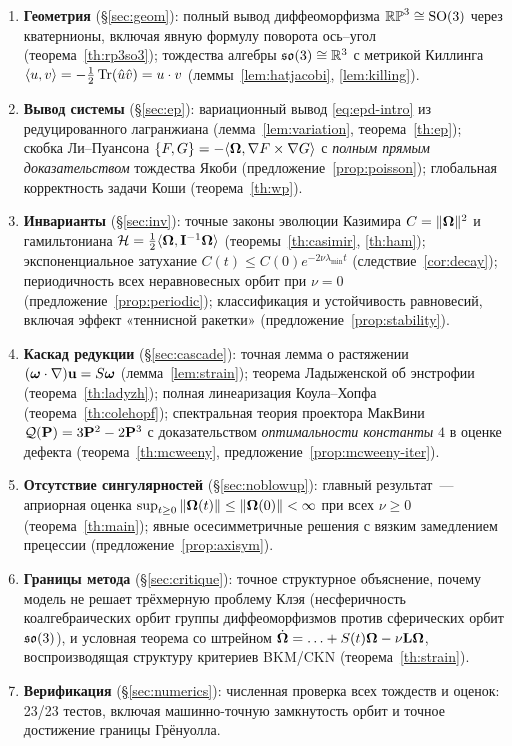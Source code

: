 \begin{enumerate}[label=\textup{(\roman*)}, leftmargin=2.2em, itemsep=2pt]
  \item \textbf{Геометрия} (\S\ref{sec:geom}): полный вывод диффеоморфизма
        $\mathbb{RP}^3 \cong \mathrm{SO}(3)$ через кватернионы, включая явную
        формулу поворота ось--угол (теорема~\ref{th:rp3so3}); тождества
        алгебры $\mathfrak{so}(3) \cong \mathbb{R}^3$ с метрикой Киллинга
        $\langle u,v\rangle = -\tfrac12\operatorname{Tr}(\hat u \hat v) = u\cdot v$
        (леммы~\ref{lem:hatjacobi}, \ref{lem:killing}).
  \item \textbf{Вывод системы} (\S\ref{sec:ep}): вариационный вывод
        \eqref{eq:epd-intro} из редуцированного лагранжиана
        (лемма~\ref{lem:variation}, теорема~\ref{th:ep}); скобка
        Ли--Пуансона $\{F,G\} = -\langle\boldsymbol{\Omega}, \nabla F \times \nabla G\rangle$
        с \emph{полным прямым доказательством} тождества Якоби
        (предложение~\ref{prop:poisson}); глобальная корректность задачи
        Коши (теорема~\ref{th:wp}).
  \item \textbf{Инварианты} (\S\ref{sec:inv}): точные законы эволюции
        Казимира $C = \|\boldsymbol{\Omega}\|^2$ и гамильтониана
        $\mathcal H = \tfrac12\langle\boldsymbol{\Omega},\mathbf{I}^{-1}\boldsymbol{\Omega}\rangle$
        (теоремы~\ref{th:casimir}, \ref{th:ham}); экспоненциальное
        затухание $C(t) \le C(0)e^{-2\nu\lambda_{\min}t}$
        (следствие~\ref{cor:decay}); периодичность всех неравновесных
        орбит при $\nu = 0$ (предложение~\ref{prop:periodic});
        классификация и устойчивость равновесий, включая эффект
        «теннисной ракетки» (предложение~\ref{prop:stability}).
  \item \textbf{Каскад редукции} (\S\ref{sec:cascade}):
        точная лемма о растяжении $(\boldsymbol{\omega}\cdot\nabla)\mathbf{u} = S\boldsymbol{\omega}$
        (лемма~\ref{lem:strain}); теорема Ладыженской об энстрофии
        (теорема~\ref{th:ladyzh}); полная линеаризация Коула--Хопфа
        (теорема~\ref{th:colehopf}); спектральная теория проектора
        МакВини $\mathcal Q(\mathbf{P}) = 3\mathbf{P}^2 - 2\mathbf{P}^3$ с доказательством
        \emph{оптимальности константы} $4$ в оценке дефекта
        (теорема~\ref{th:mcweeny}, предложение~\ref{prop:mcweeny-iter}).
  \item \textbf{Отсутствие сингулярностей} (\S\ref{sec:noblowup}):
        главный результат~--- априорная оценка
        $\sup_{t \ge 0}\|\boldsymbol{\Omega}(t)\| \le \|\boldsymbol{\Omega}(0)\| < \infty$ при всех
        $\nu \ge 0$ (теорема~\ref{th:main}); явные осесимметричные
        решения с вязким замедлением прецессии (предложение~\ref{prop:axisym}).
  \item \textbf{Границы метода} (\S\ref{sec:critique}): точное структурное
        объяснение, почему модель не решает трёхмерную проблему
        Клэя (несферичность коалгебраических орбит группы
        диффеоморфизмов против сферических орбит $\mathfrak{so}(3)$), и условная
        теорема со штрейном $\dot{\boldsymbol{\Omega}} = \ldots + S(t)\boldsymbol{\Omega} - \nu\mathbf{L}\boldsymbol{\Omega}$,
        воспроизводящая структуру критериев BKM/CKN
        (теорема~\ref{th:strain}).
  \item \textbf{Верификация} (\S\ref{sec:numerics}): численная проверка
        всех тождеств и оценок: 23/23 тестов, включая машинно-точную
        замкнутость орбит и точное достижение границы Грёнуолла.
\end{enumerate}

